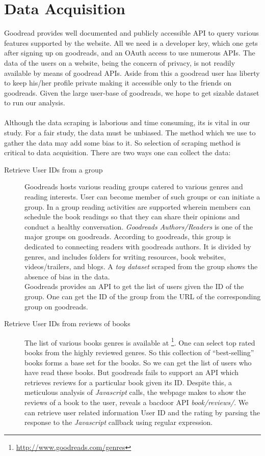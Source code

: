 \documentclass[11pt]{article}
\begin{document}
\section{Data Acquisition}
\label{sec:data_acquisition}
Goodread provides well documented and publicly accessible API to query various features supported by the website. All we need is a developer key, which one gets after signing up on goodreads, and an OAuth access to use numerous APIs. The data of the users on a website, being the concern of privacy, is not readily available by means of goodread APIs. Aside from this a goodread user has liberty to keep his/her profile private making it accessible only to the friends on goodreads. Given the large user-base of goodreads, we hope to get sizable dataset to run our analysis.\\\\
Although the data scraping is laborious and time consuming, its is vital in our study. For a fair study, the data must be unbiased. The method which we use to gather the data may add some bias to it. So selection of scraping method is critical to data acquisition. There are two ways one can collect the data:
\begin{description}
\item[Retrieve User IDs from a group]
Goodreads hosts various reading groups catered to various genres and reading interests. User can become member of such groups or can initiate a group. In a group reading activities are supported wherein members can schedule the book readings so that they can share their opinions and conduct a healthy conversation. {\it Goodreads Authors/Readers} is one of the major groups on goodreads.  According to goodreads, this group is dedicated to connecting readers with goodreads authors. It is divided by genres, and includes folders for writing resources, book websites, videos/trailers, and blogs. A {\it toy dataset} scraped from the group shows the absence of bias in the data.\\
Goodreads provides an API to get the list of users given the ID of the group. One can get the ID of the group from the URL of the corresponding group on goodreads.
\item[Retrieve User IDs from reviews of books]
The list of various books genres is available at \footnote{\url{http://www.goodreads.com/genres}}. One can select top rated books from the highly reviewed genres. So this collection of ``best-selling'' books forms a base set for the books. So we can get the list of users who have read these books. But goodreads fails to support an API which retrieves reviews for a particular book given its ID. Despite this, a meticulous analysis of \textit{Javascript} calls, the webpage makes to show the reviews of a book to the user, reveals a bacdoor API \textit{book/reviews/}. We can retrieve user related information User ID and the rating by parsing the response to the \textit{Javascript} callback using regular expression.

\end{description}
\end{document}
